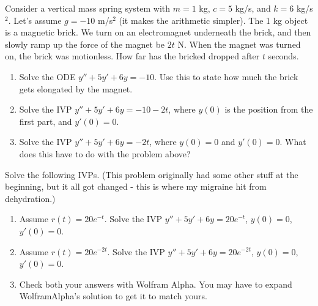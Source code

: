 \begin{problem}
 Consider a vertical mass spring system with $m=1$ kg, $c=5$ kg/s, and $k=6$ kg/s$^2$. Let's assume $g=-10$ m/s$^2$ (it makes the arithmetic simpler).   The 1 kg object is a magnetic brick. We turn on an electromagnet underneath the brick, and then slowly ramp up the force of the magnet be $2t$ N. When the magnet was turned on, the brick was motionless. How far has the bricked dropped after $t$ seconds.
\begin{enumerate}
 \item Solve the ODE $y''+5y'+6y=-10$. Use this to state how much the brick gets elongated by the magnet. 
 \item Solve the IVP $y''+5y'+6y=-10-2t$, where $y(0)$ is the position from the first part, and $y'(0)=0$. 
 \item Solve the IVP $y''+5y'+6y=-2t$, where $y(0)=0$ and $y'(0)=0$. What does this have to do with the problem above?
\end{enumerate}

\end{problem}


\begin{problem}
 Solve the following IVPs. (This problem originally had some other stuff at the beginning, but it all got changed - this is where my migraine hit from dehydration.)
\begin{enumerate}
 \item Assume $r(t) = 20e^{-t}$. Solve the IVP $y''+5y'+6y=20 e^{-t}$, $y(0)=0$, $y'(0)=0$. 
 \item Assume $r(t) = 20e^{-2t}$. Solve the IVP $y''+5y'+6y=20 e^{-2t}$, $y(0)=0$, $y'(0)=0$. 
 \item Check both your answers with Wolfram Alpha. You may have to expand WolframAlpha's solution to get it to match yours.
\end{enumerate}
\end{problem}

